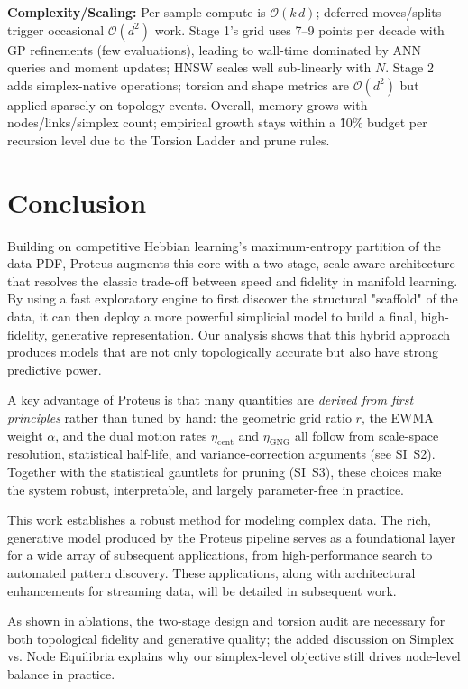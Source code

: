 \documentclass[11pt]{article}
\begin{document}
\textbf{Complexity/Scaling:} Per-sample compute is $\mathcal O(k\,d)$; deferred moves/splits trigger occasional $\mathcal O(d^2)$ work. Stage 1’s grid uses 7--9 points per decade with GP refinements (few evaluations), leading to wall-time dominated by ANN queries and moment updates; HNSW scales well sub-linearly with $N$. Stage 2 adds simplex-native operations; torsion and shape metrics are $\mathcal O(d^2)$ but applied sparsely on topology events. Overall, memory grows with nodes/links/simplex count; empirical growth stays within a \~10\% budget per recursion level due to the Torsion Ladder and prune rules.

\section{Conclusion}
Building on competitive Hebbian learning's maximum-entropy partition of the data PDF, Proteus augments this core with a two-stage, scale-aware architecture that resolves the classic trade-off between speed and fidelity in manifold learning. By using a fast exploratory engine to first discover the structural "scaffold" of the data, it can then deploy a more powerful simplicial model to build a final, high-fidelity, generative representation. Our analysis shows that this hybrid approach produces models that are not only topologically accurate but also have strong predictive power.

A key advantage of Proteus is that many quantities are \emph{derived from first principles} rather than tuned by hand: the geometric grid ratio $r$, the EWMA weight $\alpha$, and the dual motion rates $\eta_{\mathrm{cent}}$ and $\eta_{\mathrm{GNG}}$ all follow from scale-space resolution, statistical half-life, and variance-correction arguments (see SI~S2). Together with the statistical gauntlets for pruning (SI~S3), these choices make the system robust, interpretable, and largely parameter-free in practice.

This work establishes a robust method for modeling complex data. The rich, generative model produced by the Proteus pipeline serves as a foundational layer for a wide array of subsequent applications, from high-performance search to automated pattern discovery. These applications, along with architectural enhancements for streaming data, will be detailed in subsequent work.

As shown in ablations, the two-stage design and torsion audit are necessary for both topological fidelity and generative quality; the added discussion on Simplex vs. Node Equilibria explains why our simplex-level objective still drives node-level balance in practice.
\end{document}
